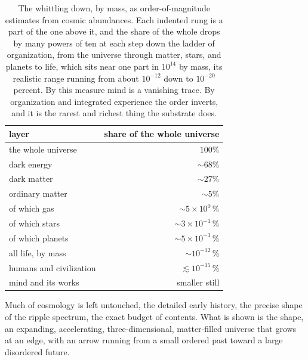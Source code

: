 \begin{table}[ht]
\centering
\begin{tabular}{@{}lr@{}}
\toprule
layer & share of the whole universe \\
\midrule
the whole universe & $100\%$ \\
\quad dark energy & $\sim 68\%$ \\
\quad dark matter & $\sim 27\%$ \\
\quad ordinary matter & $\sim 5\%$ \\
\quad\quad of which gas & $\sim 5 \times 10^{0}\,\%$ \\
\quad\quad of which stars & $\sim 3 \times 10^{-1}\,\%$ \\
\quad\quad of which planets & $\sim 5 \times 10^{-3}\,\%$ \\
\quad\quad\quad all life, by mass & $\sim 10^{-12}\,\%$ \\
\quad\quad\quad\quad humans and civilization & $\lesssim 10^{-15}\,\%$ \\
\quad\quad\quad\quad\quad mind and its works & smaller still \\
\bottomrule
\end{tabular}
\caption{The whittling down, by mass, as order-of-magnitude estimates from cosmic abundances. Each indented rung is a part of the one above it, and the share of the whole drops by many powers of ten at each step down the ladder of organization, from the universe through matter, stars, and planets to life, which sits near one part in $10^{14}$ by mass, its realistic range running from about $10^{-12}$ down to $10^{-20}$ percent. By this measure mind is a vanishing trace. By organization and integrated experience the order inverts, and it is the rarest and richest thing the substrate does.}
\label{tab:rarity}
\end{table}

Much of cosmology is left untouched, the detailed early history, the precise shape of the ripple spectrum, the exact budget of contents. What is shown is the shape, an expanding, accelerating, three-dimensional, matter-filled universe that grows at an edge, with an arrow running from a small ordered past toward a large disordered future.
